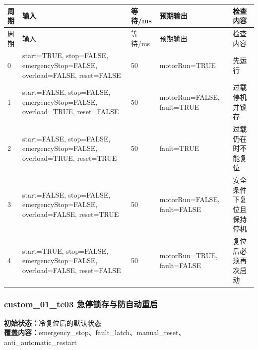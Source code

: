 \begin{longtable}{L{1.0cm}L{4.7cm}L{1.4cm}L{4.0cm}L{2.1cm}}

\toprule

周期 & 输入 & 等待/ms & 预期输出 & 检查内容\\

\midrule

\endfirsthead

\toprule

周期 & 输入 & 等待/ms & 预期输出 & 检查内容\\

\midrule

\endhead

0 & start=TRUE, stop=FALSE, emergencyStop=FALSE, overload=FALSE, reset=FALSE & 50 & motorRun=TRUE & 先运行\\

1 & start=FALSE, stop=FALSE, emergencyStop=FALSE, overload=TRUE, reset=FALSE & 50 & motorRun=FALSE, fault=TRUE & 过载停机并锁存\\

2 & start=FALSE, stop=FALSE, emergencyStop=FALSE, overload=TRUE, reset=TRUE & 50 & fault=TRUE & 过载仍在时不能复位\\

3 & start=FALSE, stop=FALSE, emergencyStop=FALSE, overload=FALSE, reset=TRUE & 50 & motorRun=FALSE, fault=FALSE & 安全条件下复位且保持停机\\

4 & start=TRUE, stop=FALSE, emergencyStop=FALSE, overload=FALSE, reset=FALSE & 50 & motorRun=TRUE, fault=FALSE & 复位后必须再次启动\\

\bottomrule

\end{longtable}

\subsubsection{{\ttfamily custom\_01\_tc03} 急停锁存与防自动重启}

\noindent\textbf{初始状态：}冷复位后的默认状态\\

\textbf{覆盖内容：}emergency\_stop、fault\_latch、manual\_reset、anti\_automatic\_restart

